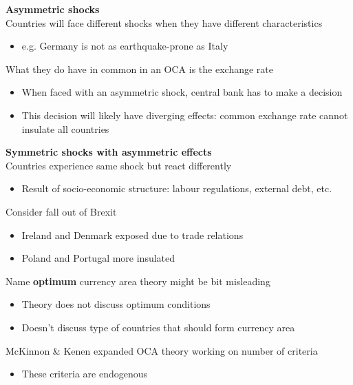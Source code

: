 \documentclass{beamer}
\begin{document}
\begin{frame}
  \textbf{Asymmetric shocks}\\
  Countries will face different shocks when they have different characteristics
  \begin{itemize}
    \item e.g. Germany is not as earthquake-prone as Italy
  \end{itemize}
  \medskip
  What they do have in common in an OCA is the exchange rate
  \begin{itemize}
    \item When faced with an asymmetric shock, central bank has to make a decision
    \item This decision will likely have diverging effects: common exchange rate cannot insulate all countries
  \end{itemize}
\end{frame}

\begin{frame}
  \textbf{Symmetric shocks with asymmetric effects}\\
  Countries experience same shock but react differently
  \begin{itemize}
    \item Result of socio-economic structure: labour regulations, external debt, etc.
  \end{itemize}
  \medskip
  Consider fall out of Brexit
  \begin{itemize}
    \item Ireland and Denmark exposed due to trade relations
    \item Poland and Portugal more insulated
  \end{itemize}
\end{frame}

\begin{frame}
  Name \textbf{optimum} currency area theory might be bit misleading
  \begin{itemize}
    \item Theory does not discuss optimum conditions
    \item Doesn't discuss type of countries that should form currency area
  \end{itemize}
  \medskip
  McKinnon \& Kenen expanded OCA theory working on number of criteria
  \begin{itemize}
    \item These criteria are endogenous
  \end{itemize}
\end{frame}
\end{document}
